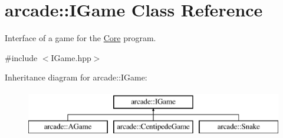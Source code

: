\hypertarget{classarcade_1_1_i_game}{\section{arcade\-:\-:I\-Game Class Reference}
\label{classarcade_1_1_i_game}
}


Interface of a game for the \hyperlink{classarcade_1_1_core}{Core} program.  




{\ttfamily \#include $<$I\-Game.\-hpp$>$}

Inheritance diagram for arcade\-:\-:I\-Game\-:\begin{figure}[H]
\begin{center}
\leavevmode
\includegraphics[height=2.000000cm]{classarcade_1_1_i_game}
\end{center}
\end{figure}
